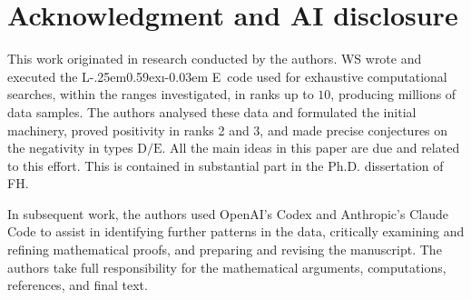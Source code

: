 \documentclass[11pt]{article}
\theoremstyle{definition}
\theoremstyle{remark}
\newcommand{\typeD}{\ensuremath{\mathrm{D}}}
\newcommand{\typeE}{\ensuremath{\mathrm{E}}}
\def\LiE{{\ssfnt L\kern-.25em\raise0.59ex\hbox{\i}\kern-0.03em E}}
\begin{document}
\section*{Acknowledgment and AI disclosure}

This work originated in research conducted by the authors.  
WS wrote and executed the \LiE\ code used for exhaustive computational
searches, within the ranges investigated, in ranks up to $10$, producing
millions of data samples.  The authors analysed these data and formulated
the initial machinery, proved positivity in ranks 2 and 3, and made precise
conjectures on the negativity in types $\typeD/\typeE$. All the main ideas
in this paper are due and related to this effort. This is contained in
substantial part in the Ph.D. dissertation of FH.

In subsequent work, the authors used OpenAI's Codex and Anthropic's Claude
Code to assist in identifying
further patterns in the data, critically examining and refining mathematical
proofs, and preparing and revising the manuscript.  The authors take full
responsibility for the mathematical arguments, computations, references, and
final text.
\end{document}
